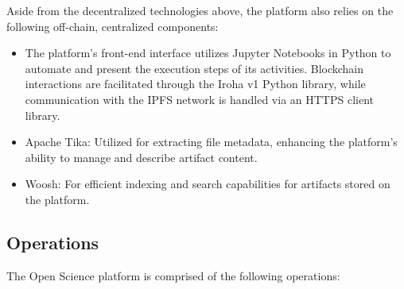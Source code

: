 \documentclass{article}
\begin{document}
Aside from the decentralized technologies above, the platform also relies on the following off-chain, centralized components:

\begin{itemize}
    \item The platform's front-end interface utilizes Jupyter Notebooks in Python to automate and present the execution steps of its activities. Blockchain interactions are facilitated through the Iroha v1 Python library, while communication with the IPFS network is handled via an HTTPS client library.
    \item Apache Tika: Utilized for extracting file metadata, enhancing the platform's ability to manage and describe artifact content.
    \item Woosh: For efficient indexing and search capabilities for artifacts stored on the platform.
\end{itemize}

\subsection{Operations}

The Open Science platform is comprised of the following operations:
\end{document}
